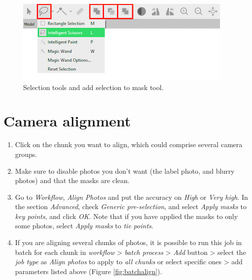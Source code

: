 \documentclass[
]{book}
\begin{document}
\begin{figure}

{\centering \includegraphics[width=0.6\linewidth]{Figures/tools_masks} 

}

\caption{Selection tools and add selection to mask tool.}\label{fig:toolsmasks}
\end{figure}

\hypertarget{camera-alignment}{%
\section{Camera alignment}\label{camera-alignment}}

\begin{enumerate}
\def\labelenumi{\arabic{enumi}.}
\item
  Click on the chunk you want to align, which could comprise several
  camera groups.
\item
  Make sure to disable photos you don't want (the label photo, and
  blurry photos) and that the masks are clean.
\item
  Go to \emph{Workflow}, \emph{Align Photos} and put the accuracy on \emph{High} or
  \emph{Very high}. In the section \emph{Advanced}, check \emph{Generic
  pre-selection}, and select \emph{Apply masks} to \emph{key points}, and click
  \emph{OK}. Note that if you have applied the masks to only some photos,
  select \emph{Apply masks} to \emph{tie points}.
\item
  If you are aligning several chunks of photos, it is possible to run
  this job in batch for each chunk in \emph{workflow} \textgreater{} \emph{batch process} \textgreater{}
  \emph{Add} button \textgreater{} select the \emph{job type} as \emph{Align photos} to apply to
  \emph{all chunks} or select specific ones \textgreater{} add parameters listed above
  (Figure \ref{fig:batchalign}).
\end{enumerate}
\end{document}
